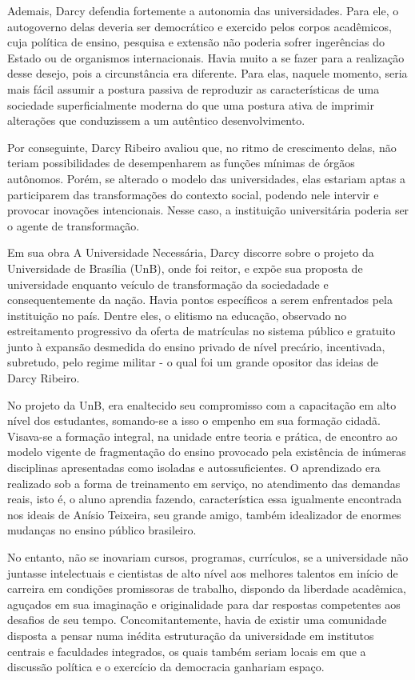 \documentclass{sbrt}
\begin{document}
Ademais, Darcy defendia fortemente a autonomia das universidades. Para ele, o autogoverno delas deveria ser democrático e exercido pelos corpos acadêmicos, cuja política de ensino, pesquisa e extensão não poderia sofrer ingerências do Estado ou de organismos internacionais. Havia muito a se fazer para a realização desse desejo, pois a circunstância era diferente. Para elas, naquele momento, seria mais fácil assumir a postura passiva de reproduzir as características de uma sociedade superficialmente moderna do que uma postura ativa de imprimir alterações que conduzissem a um autêntico desenvolvimento.

Por conseguinte, Darcy Ribeiro avaliou que, no ritmo de crescimento delas, não teriam possibilidades de desempenharem as funções mínimas de órgãos autônomos. Porém, se alterado o modelo das universidades, elas estariam aptas a participarem das transformações do contexto social, podendo nele intervir e provocar inovações intencionais. Nesse caso, a instituição universitária poderia ser o agente de transformação.

Em sua obra A Universidade Necessária, Darcy discorre sobre o projeto da Universidade de Brasília (UnB), onde foi reitor, e expõe sua proposta de universidade enquanto veículo de transformação da sociedadade e consequentemente da nação. Havia pontos específicos a serem enfrentados pela instituição no país. Dentre eles, o elitismo na educação, observado no estreitamento progressivo da oferta de matrículas no sistema público e gratuito junto à expansão desmedida do ensino privado de nível precário, incentivada, subretudo, pelo regime militar - o qual foi um grande opositor das ideias de Darcy Ribeiro.

No projeto da UnB, era enaltecido seu compromisso com a capacitação em alto nível dos estudantes, somando-se a isso o empenho em sua formação cidadã. Visava-se a formação integral, na unidade entre teoria e prática, de encontro ao modelo vigente de fragmentação do ensino provocado pela existência de inúmeras disciplinas apresentadas como isoladas e autossuficientes. O aprendizado era realizado sob a forma de treinamento em serviço, no atendimento das demandas reais, isto é, o aluno aprendia fazendo, característica essa igualmente encontrada nos ideais de Anísio Teixeira, seu grande amigo, também idealizador de enormes mudanças no ensino público brasileiro.

No entanto, não se inovariam cursos, programas, currículos, se a universidade não juntasse intelectuais e cientistas de alto nível aos melhores talentos em início de carreira em condições promissoras de trabalho, dispondo da liberdade acadêmica, aguçados em sua imaginação e originalidade para dar respostas competentes aos desafios de seu tempo. Concomitantemente, havia de existir uma comunidade disposta a pensar numa inédita estruturação da universidade em institutos centrais e faculdades integrados, os quais também seriam locais em que a discussão política e o exercício da democracia ganhariam espaço.
\end{document}
